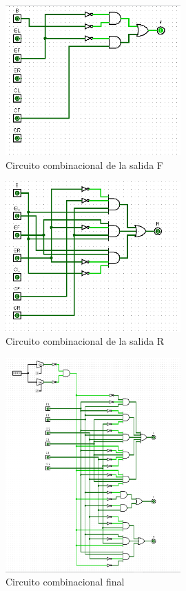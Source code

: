 \documentclass[a4paper]{article}
\begin{document}
\begin{figure}[!htbp]
    \centering
    \includegraphics[width=0.6\textwidth]{circuito_F.png}
    \caption{Circuito combinacional de la salida F}
    \label{fig:CircF}
\end{figure}

\begin{figure}[!htbp]
    \centering
    \includegraphics[width=0.6\textwidth]{circuito_R.png}
    \caption{Circuito combinacional de la salida R}
    \label{fig:CircR}
\end{figure}

\begin{figure}[!htbp]
    \centering
    \includegraphics[width=0.6\textwidth]{circuito_final.png}
    \caption{Circuito combinacional final}
    \label{fig:CircFinal}
\end{figure}
\end{document}
